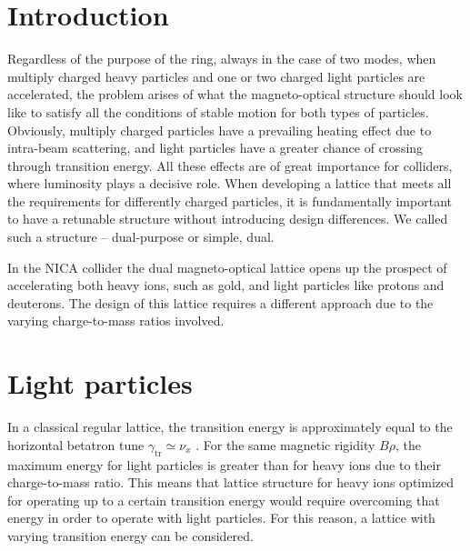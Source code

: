 \documentclass[submitting]{nst}
\begin{document}
	\section{Introduction}\label{sec.I}
	\par Regardless of the purpose of the ring, always in the case of two modes, when multiply charged heavy particles and one or two charged light particles are accelerated, the problem arises of what the magneto-optical structure should look like to satisfy all the conditions of stable motion for both types of particles. Obviously, multiply charged particles have a prevailing heating effect due to intra-beam scattering, and light particles have a greater chance of crossing through transition energy. All these effects are of great importance for colliders, where luminosity plays a decisive role. When developing a lattice that meets all the requirements for differently charged particles, it is fundamentally important to have a retunable structure without introducing design differences. We called such a structure -- dual-purpose or simple, dual.
	\par In the NICA collider the dual magneto-optical lattice opens up the prospect of accelerating both heavy ions, such as gold, and light particles like protons and deuterons. The design of this lattice requires a different approach due to the varying charge-to-mass ratios involved.
	\section{Light particles}\label{sec.II}
	In a classical regular lattice, the transition energy is approximately equal to the horizontal betatron tune $\gamma_{\text{tr}}\simeq\nu_{x}$ \cite{b1}. For the same magnetic rigidity $B\rho$, the maximum energy for light particles is greater than for heavy ions due to their charge-to-mass ratio. This means that lattice structure for heavy ions optimized for operating up to a certain transition energy would require overcoming that energy in order to operate with light particles. For this reason, a lattice with varying transition energy can be considered.
\end{document}
